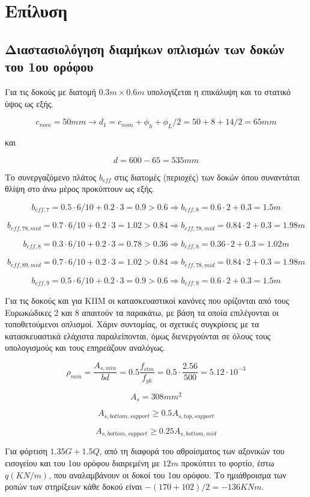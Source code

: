 \pagestyle{fancy}
\chapter{Επίλυση}
\section{Διαστασιολόγηση διαμήκων οπλισμών των δοκών του 1ου ορόφου}
\noindent
Για τις δοκούς με διατομή $0.3m\times0.6m$ υπολογίζεται η επικάλυψη και το στατικό ύψος ως εξής.

\[
c_{nom} = 50 mm \rightarrow d_1 = c_{nom} + \phi_h + \phi_L/2 = 50 + 8 + 14/2 = 65 mm
\]

\noindent
και

\[
d = 600 - 65 = 535 mm
\]

\noindent
Το συνεργαζόμενο πλάτος \(b_{eff}\) στις διατομές (περιοχές) των δοκών όπου συναντάται θλίψη στο άνω μέρος προκύπτουν ως εξής.

\[
b_{eff,7} = 0.5\cdot6/10 + 0.2\cdot3 = 0.9 > 0.6 \Rightarrow b_{eff,8} = 0.6\cdot2+0.3 = 1.5m
\]

\[
b_{eff,78,mid} = 0.7\cdot6/10 + 0.2\cdot3 = 1.02 > 0.84 \Rightarrow b_{eff,78,mid} = 0.84\cdot2+0.3 = 1.98m
\]

\[
b_{eff,8} = 0.3\cdot6/10 + 0.2\cdot3 = 0.78 > 0.36 \Rightarrow b_{eff,8} = 0.36\cdot2+0.3 = 1.02m
\]

\[
b_{eff,89,mid} = 0.7\cdot6/10 + 0.2\cdot3 = 1.02 > 0.84 \Rightarrow b_{eff,78,mid} = 0.84\cdot2+0.3 = 1.98m
\]

\[
b_{eff,9} = 0.5\cdot6/10 + 0.2\cdot3 = 0.9 > 0.6 \Rightarrow b_{eff,9} = 0.6\cdot2+0.3 = 1.5m
\]

\noindent
Για τις δοκούς και για ΚΠΜ οι κατασκευαστικοί κανόνες που ορίζονται από τους Ευρωκώδικες 2 και 8 απαιτούν τα παρακάτω, με βάση τα οποία επιλέγονται οι τοποθετούμενοι οπλισμοί. Χάριν συντομίας, οι σχετικές συγκρίσεις με τα κατασκευαστικά ελάχιστα παραλείπονται, όμως διενεργούνται σε όλους τους υπολογισμούς και τους επηρεάζουν αναλόγως.

\[
\rho_{min} = \dfrac{A_{s,min}}{bd} = 0.5\dfrac{f_{ctm}}{f_{yk}} = 0.5\cdot \dfrac{2.56}{500} = 5.12\cdot 10^{-3}
\]

\[
A_s = 308mm^2
\]

\[
A_{s,bottom,support} \geq 0.5A_{s,top,support}
\]

\[
A_{s,bottom,support} \geq 0.25A_{s,bottom,mid}
\]

\noindent
Για φόρτιση \(1.35G + 1.5Q\), από τη διαφορά του αθροίσματος των αξονικών του εισογείου και του 1ου ορόφου διαιρεμένη με $12m$ προκύπτει το φορτίο, έστω $q (KN/m)$, που αναλαμβάνουν οι δοκοί του 1ου ορόφου. Το ημιάθροισμα των ροπών των στηρίξεων κάθε δοκού είναι $-(170+102)/2= -136KNm$.

